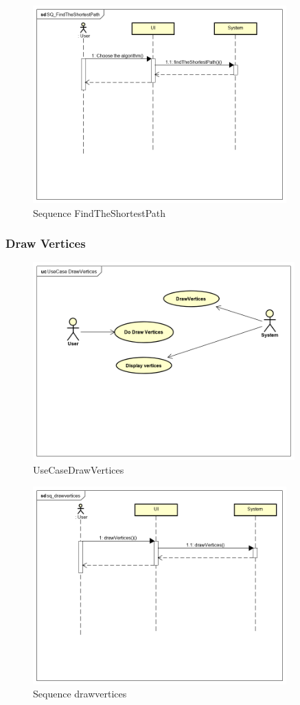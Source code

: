 \documentclass[a4paper,10pt]{article}
\begin{document}
	\begin{figure}[H]
		\centering
		\includegraphics[height = 3in]{SQ_FindTheShortestPath.png}
		\caption[Optional caption]{Sequence FindTheShortestPath}
		\label{fig:usecase_findshortestpath}
	\end{figure}
\subsubsection{Draw Vertices}
\begin{figure}[H]
		\centering
		\includegraphics[height = 3in]{UseCaseDrawVertices.png}
		\caption[Optional caption]{UseCaseDrawVertices}
		\label{fig:UseCaseDrawVertices}
	\end{figure}
	
	\begin{figure}[H]
		\centering
		\includegraphics[height = 3in]{sq_drawvertices.png}
		\caption[Optional caption]{Sequence drawvertices}
		\label{fig:Sequence_drawvertices}
	\end{figure}
	
\end{document}
